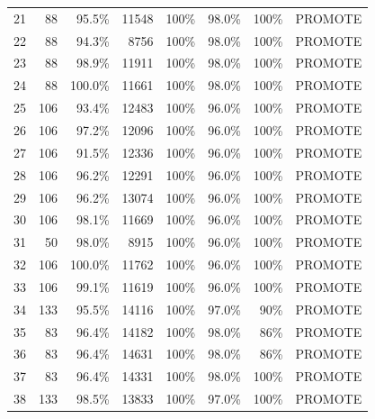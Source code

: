 \begin{table}[htbp]
\begin{tabular}{rrrrrrrl}
21 & 88 & 95.5\% & 11548 & 100\% & 98.0\% & 100\% & PROMOTE \\
22 & 88 & 94.3\% & 8756 & 100\% & 98.0\% & 100\% & PROMOTE \\
23 & 88 & 98.9\% & 11911 & 100\% & 98.0\% & 100\% & PROMOTE \\
24 & 88 & 100.0\% & 11661 & 100\% & 98.0\% & 100\% & PROMOTE \\
25 & 106 & 93.4\% & 12483 & 100\% & 96.0\% & 100\% & PROMOTE \\
26 & 106 & 97.2\% & 12096 & 100\% & 96.0\% & 100\% & PROMOTE \\
27 & 106 & 91.5\% & 12336 & 100\% & 96.0\% & 100\% & PROMOTE \\
28 & 106 & 96.2\% & 12291 & 100\% & 96.0\% & 100\% & PROMOTE \\
29 & 106 & 96.2\% & 13074 & 100\% & 96.0\% & 100\% & PROMOTE \\
30 & 106 & 98.1\% & 11669 & 100\% & 96.0\% & 100\% & PROMOTE \\
31 & 50 & 98.0\% & 8915 & 100\% & 96.0\% & 100\% & PROMOTE \\
32 & 106 & 100.0\% & 11762 & 100\% & 96.0\% & 100\% & PROMOTE \\
33 & 106 & 99.1\% & 11619 & 100\% & 96.0\% & 100\% & PROMOTE \\
34 & 133 & 95.5\% & 14116 & 100\% & 97.0\% & 90\% & PROMOTE \\
35 & 83 & 96.4\% & 14182 & 100\% & 98.0\% & 86\% & PROMOTE \\
36 & 83 & 96.4\% & 14631 & 100\% & 98.0\% & 86\% & PROMOTE \\
37 & 83 & 96.4\% & 14331 & 100\% & 98.0\% & 100\% & PROMOTE \\
38 & 133 & 98.5\% & 13833 & 100\% & 97.0\% & 100\% & PROMOTE \\
\bottomrule
\end{tabular}
\setlength{\tabcolsep}{6pt}
\end{table}
